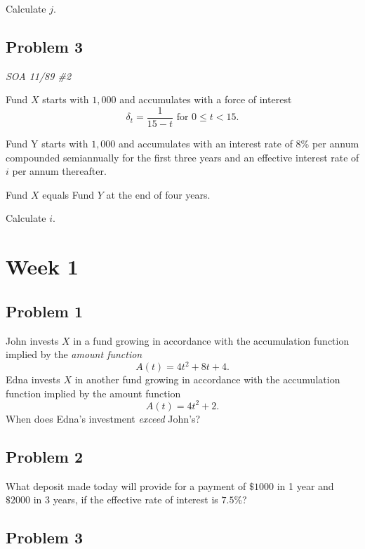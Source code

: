 \documentclass[
]{book}
\begin{document}
Calculate \(j\).

\hypertarget{problem-3-2}{%
\subsection*{Problem 3}\label{problem-3-2}}

\emph{SOA 11/89 \#2}

Fund \(X\) starts with \(1,000\) and accumulates with a force of interest \[\delta_{t}=\frac{1}{15-t} \text{ for } 0 \le t< 15.\]

Fund Y starts with \(1,000\) and accumulates with an interest rate of 8\% per annum compounded semiannually for the first three years and an effective interest rate of \(i\) per annum thereafter.

Fund \(X\) equals Fund \(Y\) at the end of four years.

Calculate \(i\).

\hypertarget{week-1}{%
\section*{Week 1}\label{week-1}}

\hypertarget{problem-1-3}{%
\subsection*{Problem 1}\label{problem-1-3}}

John invests \(X\) in a fund growing in accordance with the accumulation function implied by the \emph{amount function}
\[A(t)=4t^2+8t+4.\]
Edna invests \(X\) in another fund growing in accordance with the accumulation function implied by the amount function \[A(t)=4t^2+2.\]
When does Edna's investment \emph{exceed} John's?

\hypertarget{problem-2-3}{%
\subsection*{Problem 2}\label{problem-2-3}}

What deposit made today will provide for a payment of \(\$1000\) in 1 year and \(\$2000\) in 3 years, if the effective rate of interest is \(7.5\%\)?

\hypertarget{problem-3-3}{%
\subsection*{Problem 3}\label{problem-3-3}}
\end{document}
